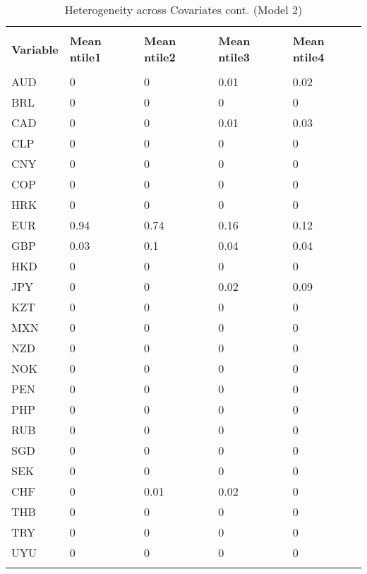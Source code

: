 \begin{table}[H]
\centering
\caption{Heterogeneity across Covariates cont. (Model 2)}
\label{Het1}
\footnotesize
\begin{tabular}{lllll}
\\[-1.8ex]\hline 
\hline \\[-1.8ex] 
{\color[HTML]{333333} \textbf{Variable}} & {\color[HTML]{333333} \textbf{Mean ntile1}} & {\color[HTML]{333333} \textbf{Mean ntile2}} & {\color[HTML]{333333} \textbf{Mean ntile3}} & {\color[HTML]{333333} \textbf{Mean ntile4}} \\
\hline \\[-1.8ex] 
AUD & 0 & 0 & \cellcolor[HTML]{FBFCFE}0.01 & \cellcolor[HTML]{F9FBFD}0.02 \\
BRL & 0 & 0 & 0 & 0 \\
CAD & 0 & 0 & \cellcolor[HTML]{FBFCFE}0.01 & \cellcolor[HTML]{F8FBFC}0.03 \\
CLP & 0 & 0 & 0 & 0 \\
CNY & 0 & 0 & 0 & 0 \\
COP & 0 & 0 & 0 & 0 \\
HRK & 0 & 0 & 0 & 0 \\
EUR & \cellcolor[HTML]{6DC283}0.94 & \cellcolor[HTML]{8BCF9E}0.74 & \cellcolor[HTML]{E4F3EA}0.16 & \cellcolor[HTML]{EAF5F0}0.12 \\
GBP & \cellcolor[HTML]{F8FBFC}0.03 & \cellcolor[HTML]{EDF6F2}0.1 & \cellcolor[HTML]{F6FAFA}0.04 & \cellcolor[HTML]{F6FAFA}0.04 \\
HKD & 0 & 0 & 0 & 0 \\
JPY & 0 & 0 & \cellcolor[HTML]{F9FBFD}0.02 & \cellcolor[HTML]{EFF7F4}0.09 \\
KZT & 0 & 0 & 0 & 0 \\
MXN & 0 & 0 & 0 & 0 \\
NZD & 0 & 0 & 0 & 0 \\
NOK & 0 & 0 & 0 & 0 \\
PEN & 0 & 0 & 0 & 0 \\
PHP & 0 & 0 & 0 & 0 \\
RUB & 0 & 0 & 0 & 0 \\
SGD & 0 & 0 & 0 & 0 \\
SEK & 0 & 0 & 0 & 0 \\
CHF & 0 & \cellcolor[HTML]{FBFCFE}0.01 & \cellcolor[HTML]{F9FBFD}0.02 & 0 \\
THB & 0 & 0 & 0 & 0 \\
TRY & 0 & 0 & 0 & 0 \\
UYU & 0 & 0 & 0 & 0 \\
\hline \\[-1.8ex] 
\end{tabular}
\end{table}

\newpage
